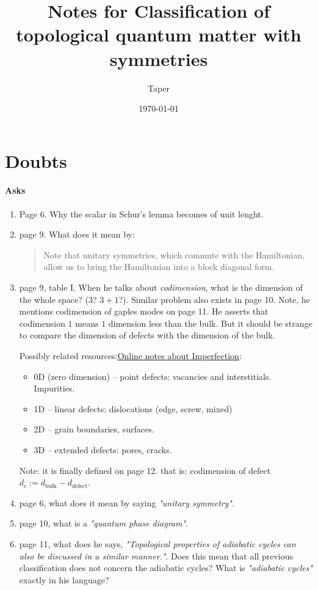 \documentclass{article}
\title{Notes for Classification of topological quantum matter with
symmetries}
\date{\today}
\author{Taper}
\begin{document}
\maketitle
{}
\tableofcontents
\section{Doubts}
\label{sec:Doubts}

\paragraph{Asks}
\begin{enumerate}
    \item Page 6. Why the scalar in Schur's lemma becomes of unit lenght.
    \item page 9. What does it mean by:
        \begin{quote}
            Note that unitary symmetries, which commute with the
            Hamiltonian, allow us to bring the Hamiltonian into a
            block diagonal form.
        \end{quote}
    \item page 9, table I. When he talks about \textit{codimension},
        what is the dimension of the whole space? ($3$? $3+1$?).
        Similar problem also exists in page 10.
        Note, he mentions codimension of gaples modes on page 11. He
        asserts that codimension $1$ means $1$ dimension less than the
        bulk. But it should be strange to compare the dimension of
        defects with the dimension of the bulk.

        Possibly related
        resources:\href{http://www.virginia.edu/bohr/mse209/chapter4.htm}
        {Online notes about Imperfection}:
        \begin{itemize}
            \item $0$D (zero dimension) – point defects: vacancies and
                interstitials. Impurities.
            \item 1D – linear defects: dislocations (edge, screw,
                mixed) 
            \item 2D – grain boundaries, surfaces.  
            \item 3D – extended defects: pores, cracks.
        \end{itemize}

        Note: it is finally defined on page 12. that is:
        codimension of defect $d_c:= d_\text{bulk} - d_\text{defect}$.
    \item page 6, what does it mean by saying \textit{"unitary
        symmetry"}.
    \item page 10, what is a \textit{"quantum phase diagram"}.
    \item page 11, what does he says, \textit{"Topological properties of
        adiabatic cycles can also be discussed in a similar manner."}.
        Does this mean that all previous classification does not
        concern the adiabatic cycles? What is \textit{"adiabatic
        cycles"} exactly in his language?


\end{enumerate}
\end{document}
